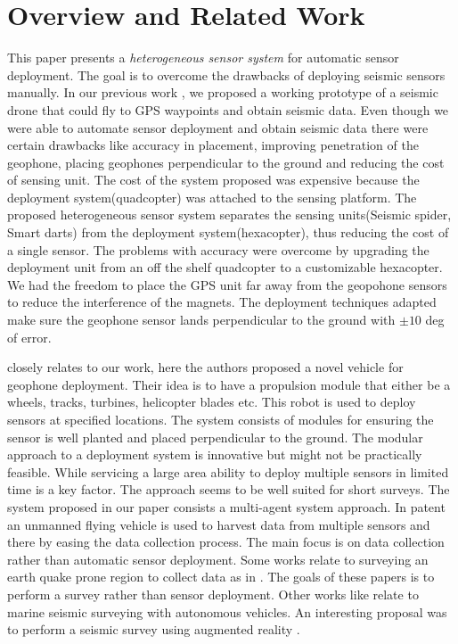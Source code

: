 \section{Overview and Related Work}\label{sec:RelatedWork}

This paper presents a \emph{heterogeneous sensor system} for automatic sensor deployment. The goal is to overcome the drawbacks of deploying seismic sensors manually. In our previous work \cite{sudarshan2015using}, we proposed a working prototype of a seismic drone that could fly to GPS waypoints and obtain seismic data. Even though we were able to automate sensor deployment and obtain seismic data there were certain drawbacks like accuracy in placement, improving penetration of the geophone, placing geophones perpendicular to the ground and reducing the cost of sensing unit. The cost of the system proposed was expensive because the deployment system(quadcopter) was attached to the sensing platform.
The proposed heterogeneous sensor system separates the sensing units(Seismic spider, Smart darts) from the deployment system(hexacopter), thus reducing the cost of a single sensor. The problems with accuracy were overcome by upgrading the deployment unit from an off the shelf quadcopter to a customizable hexacopter. We had the freedom to place the GPS unit far away from the geopohone sensors to reduce the interference of the magnets. The deployment techniques adapted make sure the geophone sensor lands perpendicular to the ground with $\pm 10$ deg of error.

 \cite{postel2014drone} closely relates to our work, here the authors proposed a novel vehicle for geophone deployment. Their idea is to have a propulsion module that either be a wheels, tracks, turbines, helicopter blades etc. This robot is used to deploy sensors at specified locations. The system consists of modules for ensuring the sensor is well planted and placed perpendicular to the ground. The modular approach to a deployment system is innovative but might not be practically feasible. While servicing a large area ability to deploy multiple sensors in limited time is a key factor. The approach seems to be well suited for short surveys. The system proposed in our paper consists a multi-agent system approach.
In patent \cite{wilcox2013seismic} an unmanned flying vehicle is used to harvest data from multiple sensors and there by easing the data collection process. The main focus is on data collection rather than automatic sensor deployment.
Some works relate to surveying an earth quake prone region to collect data as in \cite{dominici2012micro}. The goals of these papers is to perform a survey rather than sensor deployment.
Other works like \cite{muyzert2015marine} relate to marine seismic surveying with autonomous vehicles. An interesting proposal was to perform a seismic survey using augmented reality \cite{jones2016seismic}.

